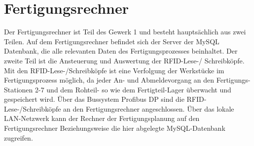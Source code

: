 \chapter{Fertigungsrechner}\label{kap:Fertigungsrechner}
 Der Fertigungsrechner ist Teil des Gewerk 1 und besteht hauptsächlich aus zwei Teilen. Auf dem Fertigungsrechner befindet sich der Server der MySQL Datenbank, die alle relevanten Daten des Fertigungsprozesses beinhaltet. Der zweite Teil ist die Ansteuerung und Auswertung der RFID-Lese-/ Schreibköpfe. Mit den RFID-Lese-/Schreibköpfe ist eine Verfolgung der Werkstücke im Fertigungsprozess möglich, da jeder An- und Abmeldevorgang an den Fertigungs-Stationen 2-7 und dem Rohteil- so wie dem Fertigteil-Lager überwacht und gespeichert wird.  Über das Bussystem Profibus DP sind die RFID-Lese-/Schreibköpfe an den Fertigungsrechner angeschlossen. Über das lokale LAN-Netzwerk kann der Rechner der Fertigungsplanung auf den Fertigungsrechner Beziehungsweise die hier abgelegte MySQL-Datenbank zugreifen.
 